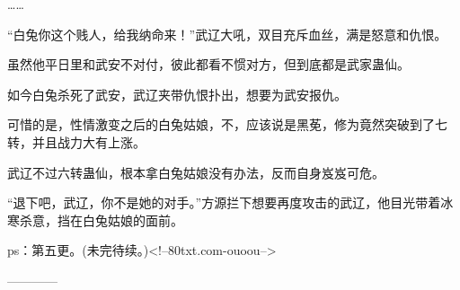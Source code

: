 \begin{this_body}
……

“白兔你这个贱人，给我纳命来！”武辽大吼，双目充斥血丝，满是怒意和仇恨。

虽然他平日里和武安不对付，彼此都看不惯对方，但到底都是武家蛊仙。

如今白兔杀死了武安，武辽夹带仇恨扑出，想要为武安报仇。

可惜的是，性情激变之后的白兔姑娘，不，应该说是黑莬，修为竟然突破到了七转，并且战力大有上涨。

武辽不过六转蛊仙，根本拿白兔姑娘没有办法，反而自身岌岌可危。

“退下吧，武辽，你不是她的对手。”方源拦下想要再度攻击的武辽，他目光带着冰寒杀意，挡在白兔姑娘的面前。

ps：第五更。(未完待续。)<!--80txt.com-ouoou-->

------------

\end{this_body}

